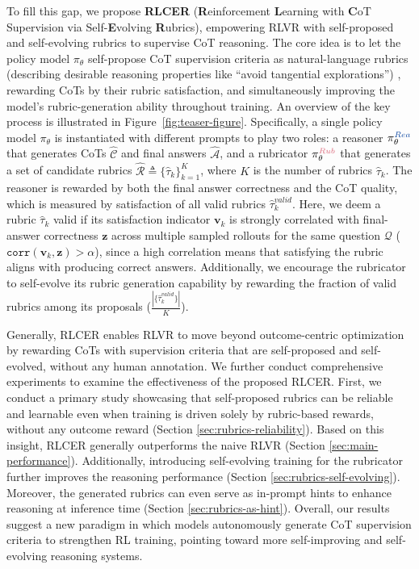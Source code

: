 To fill this gap, we propose \textbf{RLCER} (\textbf{R}einforcement \textbf{L}earning with \textbf{C}oT Supervision via Self-\textbf{E}volving \textbf{R}ubrics), empowering RLVR with self-proposed and self-evolving rubrics to supervise CoT reasoning.
The core idea is to let the policy model $\pi_\theta$ self-propose CoT supervision criteria as natural-language rubrics (\ie describing desirable reasoning properties like ``avoid tangential explorations'')
\cite{Rubrics-as-Rewards, Chasing-the-Tail}, rewarding CoTs by their rubric satisfaction, and simultaneously improving the model’s rubric-generation ability throughout training.
An overview of the key process is illustrated in Figure~\ref{fig:teaser-figure}.
Specifically, a single policy model $\pi_\theta$ is instantiated with different prompts to play two roles: a reasoner $\pi_{\theta}^{\text{\textcolor{reasoner}{$Rea$}}}$ that generates CoTs $\hat{\mathcal{C}}$ and final answers $\hat{\mathcal{A}}$, and a rubricator $\pi_{\theta}^{\text{\textcolor{rubricator}{$Rub$}}}$ that generates a set of candidate rubrics $\hat{\mathcal R} \triangleq \{\hat{\tau}_k\}_{k=1}^{K}$, where $K$ is the number of rubrics $\hat{\tau}_k$. 
The reasoner is rewarded by both the final answer correctness and the CoT quality, which is measured by satisfaction of all valid rubrics $\hat{\tau}^{valid}_k$. 
Here, we deem a rubric $\hat{\tau}_k$ valid if its satisfaction indicator $\mathbf v_k$ is strongly correlated with final-answer correctness $\mathbf z$ across multiple sampled rollouts for the same question $\mathcal Q$ (\ie $\mathtt{corr}(\mathbf v_k,\mathbf z)>\alpha$), since a high correlation means that satisfying the rubric aligns with producing correct answers. 
Additionally, we encourage the rubricator to self-evolve its rubric generation capability by rewarding the fraction of valid rubrics among its proposals
 (\ie $\frac{|\{\hat{\tau}^{valid}_k\}|}{K}$). 

Generally, RLCER enables RLVR to move beyond outcome-centric optimization by rewarding CoTs with supervision criteria that are self-proposed and self-evolved, without any human annotation.
We further conduct comprehensive experiments to examine the effectiveness of the proposed RLCER. 
First, we conduct a primary study showcasing that self-proposed rubrics can be reliable and learnable even when training is driven solely by rubric-based rewards, without any outcome reward (\cf Section \ref{sec:rubrics-reliability}). 
Based on this insight, RLCER generally outperforms the naive RLVR (\cf Section \ref{sec:main-performance}). 
Additionally, introducing self-evolving training for the rubricator further improves the reasoning performance (\cf Section \ref{sec:rubrics-self-evolving}).
Moreover, the generated rubrics can even serve as in-prompt hints to enhance reasoning at inference time (\cf Section \ref{sec:rubrics-as-hint}).
Overall, our results suggest a new paradigm in which models autonomously generate CoT supervision criteria to strengthen RL training, pointing toward more self-improving and self-evolving reasoning systems. 
